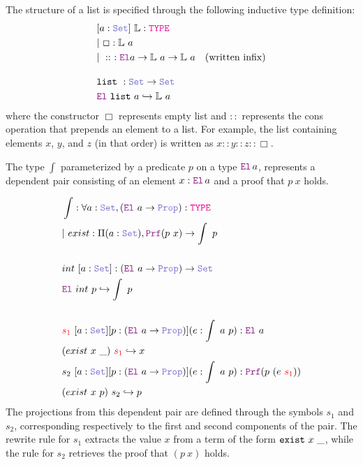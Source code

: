 \begin{definition}[List]\label{def:list}
The structure of a list is specified through the following inductive type definition:
\begin{align*}
&[a: \set]~ \bb{L}: \type \\
&|~\Box : \bb{L}~a \\
&|~\mathrel{::}~: \el  a \ra \bb{L}~a \ra \bb{L}~a \quad \text{(written infix)} \\[1em]
& \kw{list}~: \set \ra \set \\
&  \el~\kw{list}~a \re \bb{L}~a
\end{align*}
where the constructor $\Box$ represents empty list and $\mathrel{::}$ represents the cons operation that prepends an element to a list.
For example, the list containing elements $x$, $y$, and $z$ (in that order) is written as $x \mathrel{::} y \mathrel{::} z \mathrel{::} \Box$.
\end{definition}


\begin{definition}\label{dep-pair-def}
The type $\int$ parameterized by a predicate $p$ on a type $\el\,a$, represents a dependent pair consisting of an element $x : \el\,a$ and a proof that $p~x$ holds.

\begin{align*}
&\int : \forall a : \set{}, (\el{}~a \ra \prop): \type \\
&|~exist : \Pi (a : \set{}), \prf (p~x) \ra \int~p \\
&\\
& int~[a: \set{}]: (\el{}~a \ra \prop) \ra \set{} \\
& \el{}~int~p \re \int~p \\
&\\
& \textcolor{red}{s_1}~[a: \set{}] [p:(\el{}~a \ra \prop)] (e: \int~a~p): \el{}~a \\
& (exist~x~\_)~\textcolor{red}{s_1} \re x\\
& s_2~[a: \set{}] [p:(\el{}~a \ra \prop)] (e: \int~a~p): \prf{}(p~(e~\textcolor{red}{s_1})) \\
& (exist~x~p)~s_2 \re p\\
\end{align*}
The projections from this dependent pair are defined through the symbols $s_1$ and $s_2$, corresponding respectively to the first and second components of the pair.
The rewrite rule for $s_1$ extracts the value $x$ from a term of the form $\texttt{\upshape{exist}}~x~\_$, while the rule for $s_2$ retrieves the proof that $(p~x)$ holds.
\end{definition}

